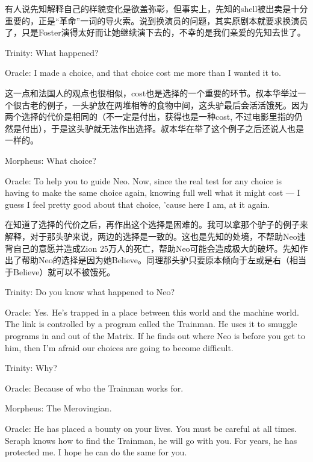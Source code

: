\documentclass[UTF8]{ctexart}
\newenvironment{myquote}{\color{green} \setlength{\leftskip}{6em} \setlength{\rightskip}{4em} \setlength{\parindent}{-2em}}{\par}
\begin{document}
有人说先知解释自己的样貌变化是欲盖弥彰，但事实上，先知的shell被出卖是十分重要的，正是“革命”一词的导火索。说到换演员的问题，其实原剧本就要求换演员了，只是Foster演得太好而让她继续演下去的，不幸的是我们亲爱的先知去世了。

\begin{myquote}
Trinity: What happened?

Oracle: I made a choice, and that choice cost me more than I wanted it to.
\end{myquote}

这一点和法国人的观点也很相似，cost也是选择的一个重要的环节。叔本华举过一个很古老的例子，一头驴放在两堆相等的食物中间，这头驴最后会活活饿死。因为两个选择的代价是相同的（不一定是付出，获得也是一种cost, 不过电影里指的仍然是付出），于是这头驴就无法作出选择。叔本华在举了这个例子之后还说人也是一样的。

\begin{myquote}
Morpheus: What choice?

Oracle: To help you to guide Neo. Now, since the real test for any choice is having to make the same choice again, knowing full well what it might cost --- I guess I feel pretty good about that choice, 'cause here I am, at it again.
\end{myquote}

在知道了选择的代价之后，再作出这个选择是困难的。我可以拿那个驴子的例子来解释，对于那头驴来说，两边的选择是一致的。这也是先知的处境，不帮助Neo违背自己的意愿并造成Zion 25万人的死亡，帮助Neo可能会造成极大的破坏。先知作出了帮助Neo的选择是因为她Believe。同理那头驴只要原本倾向于左或是右（相当于Believe）就可以不被饿死。

\begin{myquote}
Trinity: Do you know what happened to Neo?

Oracle: Yes. He's trapped in a place between this world and the machine world. The link is controlled by a program called the Trainman. He uses it to smuggle programs in and out of the Matrix. If he finds out where Neo is before you get to him, then I'm afraid our choices are going to become difficult.

Trinity: Why?

Oracle: Because of who the Trainman works for.

Morpheus: The Merovingian.

Oracle: He has placed a bounty on your lives. You must be careful at all times. Seraph knows how to find the Trainman, he will go with you. For years, he has protected me. I hope he can do the same for you.
\end{myquote}
\end{document}
